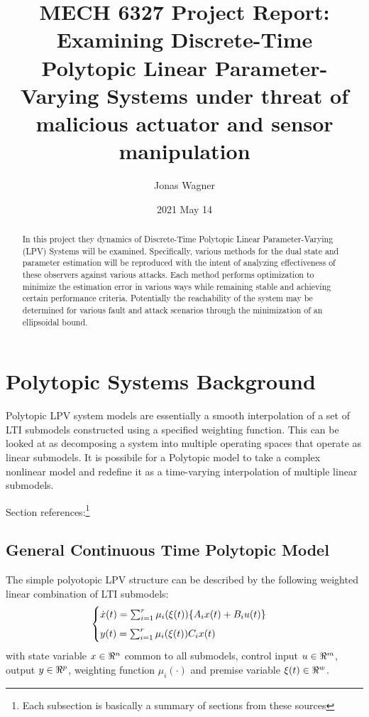 \documentclass[]{article}
\title{MECH 6327 Project Report:\\
Examining Discrete-Time Polytopic Linear Parameter-Varying Systems under threat of malicious actuator and sensor manipulation}
\author{Jonas Wagner}
\date{2021 May 14}
\begin{document}
\maketitle

\begin{abstract}
	In this project they dynamics of Discrete-Time Polytopic Linear Parameter-Varying (LPV) Systems will be examined. Specifically, various methods for the dual state and parameter estimation will be reproduced with the intent of analyzing effectiveness of these observers against various attacks. Each method performs optimization to minimize the estimation error in various ways while remaining stable and achieving certain performance criteria. Potentially the reachability of the system may be determined for various fault and attack scenarios through the minimization of an ellipsoidal bound.
\end{abstract}


\newpage
\tableofcontents


\newpage
\section{Polytopic Systems Background}
Polytopic LPV system models are essentially a smooth interpolation of a set of LTI submodels constructed using a specified weighting function. This can be looked at as decomposing a system into multiple operating spaces that operate as linear submodels. It is possibile for a Polytopic model to take a complex nonlinear model and redefine it as a time-varying interpolation of multiple linear submodels.

Section references:\footnote{Each subsection is basically a summary of sections from these sources}
\cite{ORJUELA2019295} \cite{orjuela2013nonlinear} \cite{beelen2017joint}\\

\subsection{General Continuous Time Polytopic Model} 
The simple polyotopic LPV structure can be described by the following weighted linear combination of LTI submodels:
\begin{equation}\label{eq:CT_poly_sys_def}
	\begin{cases}
		\dot{x}(t) 	= \sum_{i=1}^r \mu_i(\xi(t))\{A_i x(t) + B_i u(t)\}  \vspace{5pt} \\ 
		y(t)		= \sum_{i=1}^r \mu_i(\xi(t)) C_i x(t)
	\end{cases}
\end{equation}
with state variable $x \in \real^n$ common to all submodels, control input $u \in \real^m$, output $y \in \real^p$, weighting function $\mu_i(\cdot)$ and premise variable $\xi(t) \in \real^{w}$. 
\end{document}
